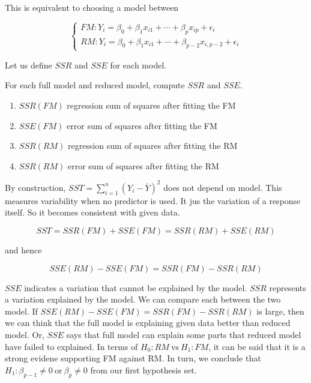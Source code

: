 \documentclass[]{book}
\theoremstyle{definition}
\theoremstyle{definition}
\theoremstyle{definition}
\theoremstyle{remark}
\let\BeginKnitrBlock\begin \let\EndKnitrBlock\end
\begin{document}
This is equivalent to choosing a model between

\[
\begin{cases}
  FM: Y_i = \beta_0 + \beta_1 x_{i1} + \cdots + \beta_p x_{ip} + \epsilon_i \\
  RM: Y_i = \beta_0 + \beta_1 x_{i1} + \cdots + \beta_{p - 2}x_{i,p-2} + \epsilon_i
\end{cases}
\]

Let us define \(SSR\) and \(SSE\) for each model.

\BeginKnitrBlock{definition}[SS of nested models]
\protect\hypertarget{def:ssfmrm}{}{\label{def:ssfmrm} {} }For each full model and reduced model, compute \(SSR\) and \(SSE\).

\begin{enumerate}
  \item $SSR(FM)$ regression sum of squares after fitting the FM
  \item $SSE(FM)$ error sum of squares after fitting the FM
  \item $SSR(RM)$ regression sum of squares after fitting the RM
  \item $SSR(RM)$ error sum of squares after fitting the RM
\end{enumerate}
\EndKnitrBlock{definition}

By construction, \(SST = \sum\limits_{i = 1}^n(Y_i - \overline{Y})^2\) does not depend on model. This measures variability when no predictor is used. It jus the variation of a response itself. So it becomes consistent with given data.

\BeginKnitrBlock{remark}
{}\[SST = SSR(FM) + SSE(FM) = SSR(RM) + SSE(RM)\]

and hence

\[SSE(RM) - SSE(FM) = SSR(FM) - SSR(RM)\]
\EndKnitrBlock{remark}

\(SSE\) indicates a variation that cannot be explained by the model. \(SSR\) represents a variation explained by the model. We can compare each between the two model. If \(SSE(RM) - SSE(FM) = SSR(FM) - SSR(RM)\) is large, then we can think that the full model is explaining given data better than reduced model. Or, \(SSE\) says that full model can explain some parts that reduced model have failed to explained. In terms of \(H_0: RM \:\text{vs}\: H_1: FM\), it can be said that it is a strong evidene supporting FM against RM. In turn, we conclude that \(H_1: \beta_{p - 1} \neq 0 \:\text{or}\: \beta_p \neq 0\) from our first hypothesis set.
\end{document}
